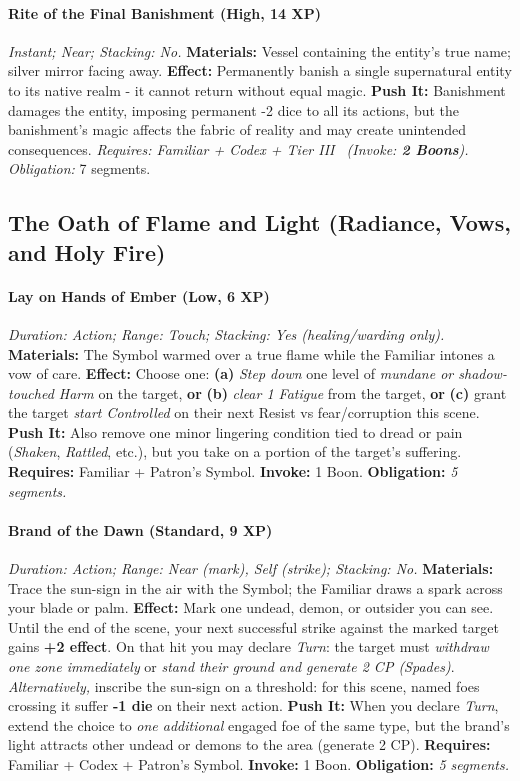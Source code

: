 \documentclass[12pt,twoside]{book}
\begin{document}
\paragraph{Rite of the Final Banishment (High, 14 XP)} \emph{Instant; Near; Stacking: No.}
\textbf{Materials:} Vessel containing the entity's true name; silver mirror facing away.
\textbf{Effect:} Permanently banish a single supernatural entity to its native realm - it cannot return without equal magic.
\textbf{Push It:} Banishment damages the entity, imposing permanent -2 dice to all its actions, but the banishment's magic affects the fabric of reality and may create unintended consequences.
\emph{Requires: Familiar + Codex + Tier III \ (\textit{Invoke:} \textbf{2 Boons}).}
\emph{Obligation:} 7 segments.

\subsection{The Oath of Flame and Light (Radiance, Vows, and Holy Fire)}
\paragraph{Lay on Hands of Ember (Low, 6 XP)} \emph{Duration: Action; Range: Touch; Stacking: Yes (healing/warding only).}  
\textbf{Materials:} The Symbol warmed over a true flame while the Familiar intones a vow of care.  
\textbf{Effect:} Choose one: \textbf{(a)} \emph{Step down} one level of \emph{mundane or shadow-touched Harm} on the target, \textbf{or} \textbf{(b)} \emph{clear 1 Fatigue} from the target, \textbf{or} \textbf{(c)} grant the target \emph{start Controlled} on their next Resist vs fear/corruption this scene.  
\textbf{Push It:} Also remove one minor lingering condition tied to dread or pain (\emph{Shaken}, \emph{Rattled}, etc.), but you take on a portion of the target's suffering.
\textbf{Requires:} Familiar + Patron's Symbol. \;\; \textbf{Invoke:} 1 Boon. \;\; \textbf{Obligation:} \emph{5 segments.}


\paragraph{Brand of the Dawn (Standard, 9 XP)} \emph{Duration: Action; Range: Near (mark), Self (strike); Stacking: No.}  
\textbf{Materials:} Trace the sun-sign in the air with the Symbol; the Familiar draws a spark across your blade or palm.  
\textbf{Effect:} Mark one undead, demon, or outsider you can see. Until the end of the scene, your next successful strike against the marked target gains \textbf{+2 effect}. On that hit you may declare \emph{Turn}: the target must \emph{withdraw one zone immediately} or \emph{stand their ground and generate 2 CP (Spades)}.  
\emph{Alternatively,} inscribe the sun-sign on a threshold: for this scene, named foes crossing it suffer \textbf{-1 die} on their next action.  
\textbf{Push It:} When you declare \emph{Turn}, extend the choice to \emph{one additional} engaged foe of the same type, but the brand's light attracts other undead or demons to the area (generate 2 CP).
\textbf{Requires:} Familiar + Codex + Patron's Symbol. \;\; \textbf{Invoke:} 1 Boon. \;\; \textbf{Obligation:} \emph{5 segments.}
\end{document}
